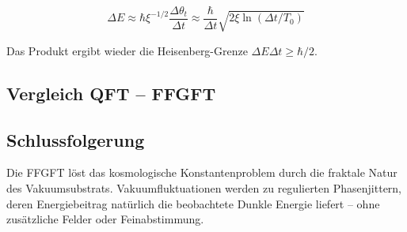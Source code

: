 	\begin{equation}
		\Delta E \approx \hbar \xi^{-1/2} \frac{\Delta \theta_t}{\Delta t} \approx \frac{\hbar}{\Delta t} \sqrt{2 \xi \ln(\Delta t / T_0)}
	\end{equation}
	
	Das Produkt ergibt wieder die Heisenberg-Grenze \(\Delta E \Delta t \geq \hbar/2\).
	
	\subsection*{Vergleich QFT – FFGFT}
	
	\begin{center}
		\small
	\end{center}
	
	\subsection*{Schlussfolgerung}
	
	Die FFGFT löst das kosmologische Konstantenproblem durch die fraktale Natur des Vakuumsubstrats. Vakuumfluktuationen werden zu regulierten Phasenjittern, deren Energiebeitrag natürlich die beobachtete Dunkle Energie liefert – ohne zusätzliche Felder oder Feinabstimmung.




